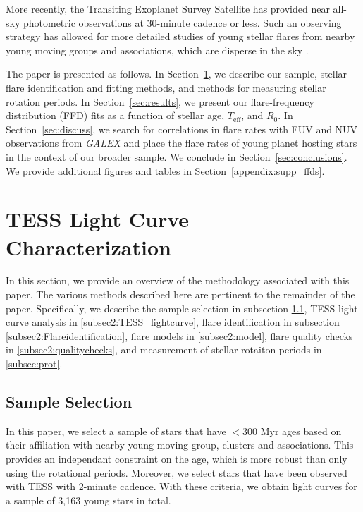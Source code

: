 \documentclass[twocolumn]{aastex631}
\begin{document}
More recently, the Transiting Exoplanet Survey Satellite \citep[TESS;][]{ricker15} has provided near all-sky photometric observations at 30-minute cadence or less. Such an observing strategy has allowed for more detailed studies of young stellar flares from nearby young moving groups and associations, which are disperse in the sky \citep{}.

The paper is presented as follows. In Section~\ref{sec:methods}, we describe our sample, stellar flare identification and fitting methods, and methods for measuring stellar rotation periods. In Section~\ref{sec:results}, we present our flare-frequency distribution (FFD) fits as a function of stellar age, $T_\textrm{eff}$, and $R_0$. In Section~\ref{sec:discuss}, we search for correlations in flare rates with FUV and NUV observations from \textit{GALEX} and place the flare rates of young planet hosting stars in the context of our broader sample. We conclude in Section~\ref{sec:conclusions}. We provide additional figures and tables in Section~\ref{appendix:supp_ffds}.

\section{TESS Light Curve Characterization}\label{sec:methods}

In this section, we provide an overview of the methodology associated with this paper. The various methods described here are pertinent to the remainder of the paper. Specifically, we describe the sample selection in subsection \ref{subsec2:sample}, TESS light curve analysis in \ref{subsec2:TESS_lightcurve}, flare identification in subsection \ref{subsec2:Flareidentification}, flare models in \ref{subsec2:model}, flare quality checks in \ref{subsec2:qualitychecks}, and measurement of stellar rotaiton periods in \ref{subsec:prot}.

\subsection{Sample Selection}\label{subsec2:sample}

In this paper, we select a sample of stars that have $<300$ Myr ages based on their affiliation with nearby young moving group, clusters and associations. This provides an independant constraint on the age, which is more robust than only using the rotational periods. Moreover, we select stars that have been observed with TESS with 2-minute cadence. With these criteria, we obtain light curves for a sample of 3,163 young stars in total.
\end{document}
